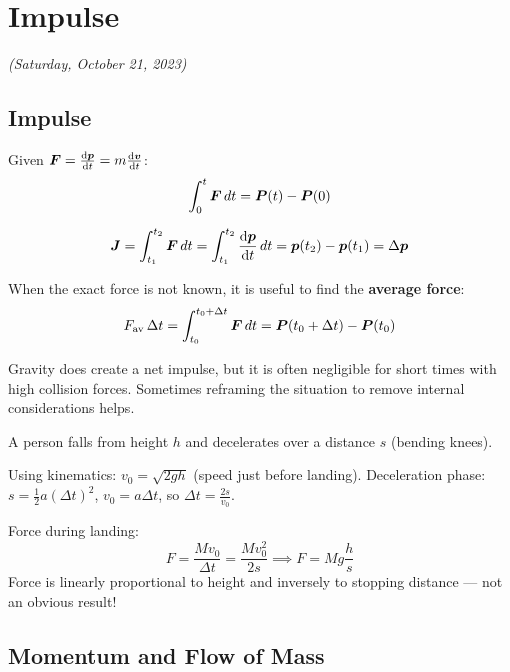 \chapter{Impulse}

\textit{(Saturday, October 21, 2023)}

\section{Impulse}

Given $\vect{F} = \dv{\lvect{p}}{t} = m\dv{\lvect{v}}{t}$:
\[
    \int_0^t \vect{F}\,dt = \vect{P}(t) - \vect{P}(0)
\]

\begin{definition}[Impulse]
    \[
        \vect{J} = \int_{t_1}^{t_2}\vect{F}\,dt = \int_{t_1}^{t_2}\dv{\lvect{p}}{t}\,dt = \lvect{p}(t_2) - \lvect{p}(t_1) = \Delta\lvect{p}
    \]
\end{definition}

When the exact force is not known, it is useful to find the \textbf{average force}:
\[
    F_{\text{av}}\,\Delta t = \int_{t_0}^{t_0+\Delta t}\vect{F}\,dt = \vect{P}(t_0+\Delta t) - \vect{P}(t_0)
\]

\begin{fact}
Gravity does create a net impulse, but it is often negligible for short times with high collision forces. Sometimes reframing the situation to remove internal considerations helps.
\end{fact}

\begin{example}
A person falls from height $h$ and decelerates over a distance $s$ (bending knees).

Using kinematics: $v_0 = \sqrt{2gh}$ (speed just before landing). Deceleration phase: $s = \frac{1}{2}a(\Delta t)^2$, $v_0 = a\Delta t$, so $\Delta t = \frac{2s}{v_0}$.

Force during landing:
\[
    F = \frac{Mv_0}{\Delta t} = \frac{Mv_0^2}{2s} \implies F = Mg\frac{h}{s}
\]
Force is linearly proportional to height and inversely to stopping distance --- not an obvious result!
\end{example}

\section{Momentum and Flow of Mass}

